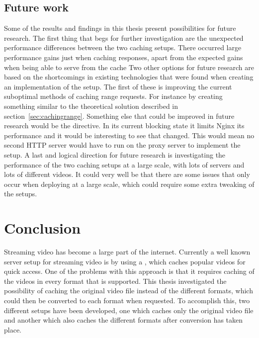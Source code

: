 \documentclass[twoside,openright]{uva-bachelor-thesis}
\begin{document}
\section{Future work}
Some of the results and findings in this thesis present possibilities for future
research. The first thing that begs for further investigation are the unexpected
performance differences between the two caching \lt setups. There occurred large
performance gains just when caching responses, apart from the expected gains
when being able to serve from the cache
Two other options for future research are based on the
shortcomings in existing technologies that were found when creating an
implementation of the \lt setup. The first of these is improving the current
suboptimal methods of caching range requests. For instance by creating something
similar to the theoretical solution described in section~\ref{sec:cachingrange}.
Something else that could be improved in future research would be the \ipplong
directive. In its current blocking state it limits Nginx its performance and it
would be interesting to see that changed. This would mean no second HTTP server
would have to run on the proxy server to implement the \lt setup. A last and
logical direction for future research is investigating the performance of the
two caching \lt setups at a large scale, with lots of servers and lots of
different videos. It could very well be that there are some issues that only
occur when deploying at a large scale, which could require some extra tweaking
of the setups.





\chapter{Conclusion}
Streaming video has become a large part of the internet. Currently a well known
server setup for streaming video is by using a \cdn, which caches popular videos
for quick access. One of the problems with this approach is that it requires
caching of the videos in every format that is supported. This thesis
investigated the possibility of caching the original video file instead of the
different formats, which could then be converted to each format when requested.
To accomplish this, two different setups have been developed, one which caches
only the original video file and another which also caches the different formats
after conversion has taken place.
\end{document}
